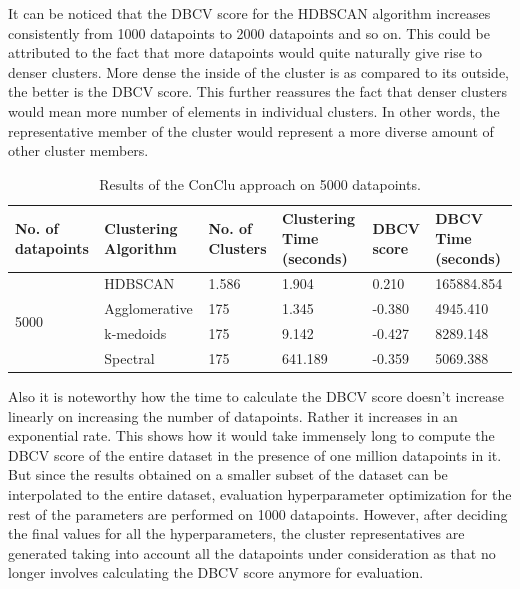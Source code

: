 It can be noticed that the \ac{DBCV} score for the \ac{HDBSCAN} algorithm increases consistently from 1000 datapoints to 2000 datapoints and so on. This could be attributed to the fact that more datapoints would quite naturally give rise to denser clusters. More dense the inside of the cluster is as compared to its outside, the better is the \ac{DBCV} score. This further reassures the fact that denser clusters would mean more number of elements in individual clusters. In other words, the representative member of the cluster would represent a more diverse amount of other cluster members. 

\begin{table}[H]
  \setlength\extrarowheight{10pt}
  \caption{Results of the ConClu approach on 5000 datapoints. }
  \centering
  \begin{tabular}{|p{50pt}|p{60pt}|p{50pt}|p{40pt}|p{50pt}|p{50pt}|}
    \toprule
    No. of datapoints & Clustering Algorithm & No. of Clusters & Clustering Time (seconds) & \ac{DBCV} score & \ac{DBCV} Time (seconds)\\
    \midrule
    \multirow{4}{1.0in}{5000} & \ac{HDBSCAN}	& 1.586	& 1.904 & 0.210	& 165884.854 \\ \cline{2-6} 
                              & Agglomerative	& 175	& 1.345 & -0.380	& 4945.410 \\ \cline{2-6} 
                              & k-medoids	& 175	& 9.142 & -0.427	& 8289.148 \\ \cline{2-6}
                              & Spectral	& 175	& 641.189 & -0.359	& 5069.388 \\ 
    \bottomrule
  \end{tabular}
  \label{tab:conclu_5000}
\end{table}

Also it is noteworthy how the time to calculate the \ac{DBCV} score doesn't increase linearly on increasing the number of datapoints. Rather it increases in an exponential rate. This shows how it would take immensely long to compute the \ac{DBCV} score of the entire dataset in the presence of one million datapoints in it. But since the results obtained on a smaller subset of the dataset can be interpolated to the entire dataset, evaluation hyperparameter optimization for the rest of the parameters are performed on 1000 datapoints. However, after deciding the final values for all the hyperparameters, the cluster representatives are generated taking into account all the datapoints under consideration as that no longer involves calculating the \ac{DBCV} score anymore for evaluation.  

